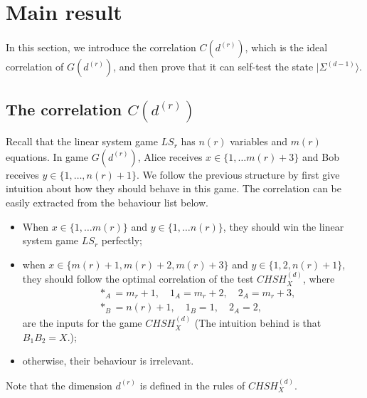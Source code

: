 \documentclass[11pt,letterpaper]{article}
\newcommand{\ket}[1]{|#1\rangle}
\newcommand{\1}{\mathbb{1}}
\newcommand{\CHSH}{CHSH^{(d)}}
\newcommand{\EPR}[1]{\Sigma^{(#1)}}
\newcommand{\G}{G}
\newcommand{\LS}{LS}
\newcommand{\dr}[1]{d^{(#1)}}
\newcommand{\nr}{n(r)}
\newcommand{\mr}{m(r)}
\theoremstyle{definition}
\begin{document}
\section{Main result}
\label{sec:main}
In this section, we introduce the correlation $C(\dr{r})$, which is the
ideal correlation of $\G(\dr{r})$, and then
prove that it can self-test the state $\ket{\EPR{d-1}}$.

\subsection{The correlation $C(\dr{r})$}
Recall that the linear system game $\LS_r$ has $\nr$ variables and $\mr$ equations.
In game $\G(\dr{r})$, 
Alice receives $x \in \{1,\dots \mr+3 \}$ and Bob receives
$y \in \{1,\dots,\nr+1\}$. We follow the previous structure by first give intuition about how they should
behave in this game. The correlation can be easily extracted from the behaviour list below.
\begin{itemize}
	\item When $x \in \{1,\dots \mr\}$ and $y \in \{1, \dots \nr\}$, they should win the 
	linear system game $\LS_r$ perfectly;
	\item when $x \in \{\mr+1, \mr+2, \mr+3\}$ and $y \in \{1, 2, \nr+1\}$, they should follow the
	optimal correlation of the test $\CHSH_X$, where 
	\begin{align}
		&\ast_A = m_r+1, \quad 1_A = m_r+2,\quad 2_A = m_r+3,\\
		&\ast_B = \nr+1,\quad 1_B = 1, \quad 2_A = 2,
	\end{align}
	are the inputs for the game $\CHSH_X$
	(The intuition behind is that $B_1B_2 = X$.);
	\item otherwise, their behaviour is irrelevant.
\end{itemize}
Note that the dimension $\dr{r}$ is defined in the rules of $\CHSH_X$.
\end{document}
